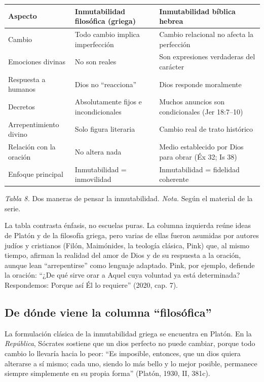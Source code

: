 \documentclass[11pt,letterpaper]{article}
\begin{document}
\begin{center}\small\renewcommand{\arraystretch}{1.18}
\begin{tabular}{@{}L{3.0cm}L{5.0cm}L{5.8cm}@{}}
\toprule
\textbf{Aspecto} & \textbf{Inmutabilidad filosófica (griega)} & \textbf{Inmutabilidad bíblica hebrea} \\ \midrule
Cambio & Todo cambio implica imperfección & Cambio relacional no afecta la perfección \\
Emociones divinas & No son reales & Son expresiones verdaderas del carácter \\
Respuesta a humanos & Dios no ``reacciona'' & Dios responde moralmente \\
Decretos & Absolutamente fijos e incondicionales & Muchos anuncios son condicionales (Jer 18:7--10) \\
Arrepentimiento divino & Solo figura literaria & Cambio real de trato histórico \\
Relación con la oración & No altera nada & Medio establecido por Dios para obrar (Éx 32; Is 38) \\
Enfoque principal & Inmutabilidad = inmovilidad & Inmutabilidad = fidelidad coherente \\
\bottomrule
\end{tabular}\par
{\footnotesize\color{gris}\textit{Tabla 8.} Dos maneras de pensar la inmutabilidad. \textit{Nota.} Según el material de la serie.}
\end{center}

\begin{nota}[Precisión]
La tabla contrasta énfasis, no escuelas puras. La columna izquierda reúne ideas de Platón y de la filosofía griega, pero varias de ellas fueron asumidas por autores judíos y cristianos (Filón, Maimónides, la teología clásica, Pink) que, al mismo tiempo, afirman la realidad del amor de Dios y de su respuesta a la oración, aunque lean ``arrepentirse'' como lenguaje adaptado. Pink, por ejemplo, defiende la oración: ``¿De qué sirve orar a Aquel cuya voluntad ya está determinada? Respondemos: Porque así Él lo requiere'' (2020, cap. 7).
\end{nota}

\subsection{De dónde viene la columna ``filosófica''}
La formulación clásica de la inmutabilidad griega se encuentra en Platón. En la \emph{República}, Sócrates sostiene que un dios perfecto no puede cambiar, porque todo cambio lo llevaría hacia lo peor: ``Es imposible, entonces, que un dios quiera alterarse a sí mismo; cada uno, siendo lo más bello y lo mejor posible, permanece siempre simplemente en su propia forma'' (Platón, 1930, II, 381c).
\end{document}
